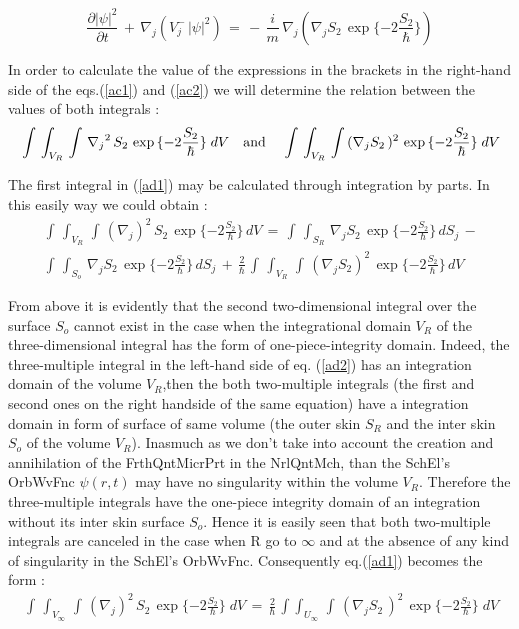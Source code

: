 \documentclass[12pt]{article}
\begin{document}
\begin{equation}\label{ac2}
\frac{\partial {\left|\psi\right|^2}}{\partial t}\,+
\,\nabla _j \left(V_j^{-}\,{\left|\psi\right|^2}\right)\,=
\,-\,\frac{i}{m}\,\nabla _j \left(\nabla _j {S_2}
\,\exp{\{-2\frac{S_2}{\hbar}\}}\right)
\end{equation}

 In order to calculate the value of the expressions in the brackets in the
right-hand side of the eqs.(\ref{ac1}) and (\ref{ac2}) we will determine
the relation between the values of both integrals :
\begin{equation}\label{ad1}
\,\int\,\int_{V_R}\,\int\,{\nabla_j}^2\,{S_2}\,
\exp{\{-2\frac{S_2}{\hbar}\}}\;dV
\quad {\rm and} \quad
\,\int\,\int_{V_R}\,\int\,(\nabla _j {S_2}\,)^2\,
\exp{\{-2\frac{S_2}{\hbar}\}}\;dV
\end{equation}

 The first integral in (\ref{ad1}) may be calculated through integration by
parts.  In this easily way we could obtain :
\begin{eqnarray}\label{ad2}
\,\int\,\int_{V_R}\,\int\,(\nabla _j)^2\,{S_2}
\,\exp{\{-2\frac{S_2}{\hbar}\}}\,dV\,=
\,\int\,\int_{S_R}\,\nabla _j {S_2}
\,\exp{\{-2\frac{S_2}{\hbar}\}}\,dS_j\,-  \nonumber  \\
\,\int\,\int_{S_o}\,\nabla_j {S_2}
\,\exp{\{-2\frac{S_2}{\hbar}\}}\,dS_j\,+
\,\frac{2}{\hbar}\,\int\,\int_{V_R}\,\int\,(\nabla _j {S_2})^2\,
\exp{\{-2\frac{S_2}{\hbar}\}}\,dV
\end{eqnarray}

 From above it is evidently that the second two-dimensional integral over
the surface $S_o$ cannot exist in the case when the integrational domain
$V_R$ of the three-dimensional integral has the form of one-piece-integrity
domain. Indeed, the three-multiple integral in the left-hand side of eq.
(\ref{ad2}) has an integration domain of the volume $V_R$,then the both
two-multiple integrals (the first and second ones on the right handside
of the same equation) have a integration domain in form of surface of same
volume (the outer skin $S_R$ and the inter skin $S_o$ of the volume $V_R$).
Inasmuch as we don't take into account the creation and annihilation of the
FrthQntMicrPrt in the NrlQntMch, than the SchEl's OrbWvFnc $\psi(r,t)$ may
have no singularity within the volume $V_R$. Therefore the three-multiple
integrals have the one-piece integrity domain of an integration without
its inter skin surface $S_o$. Hence it is easily seen that both two-multiple
integrals are canceled in the case when R go to $\infty$ and at the absence
of any kind of singularity in the SchEl's OrbWvFnc. Consequently eq.(\ref{ad1})
becomes the form :
\begin{eqnarray}\label{ae}
\,\int\,\int_{V_\infty}\,\int\,(\nabla _j)^2\,{S_2}
\,\exp{\{-2\frac{S_2}{\hbar}\}}\;dV\,
=\,\frac{2}{\hbar}\,\int\int_{U_\infty}\,\int\,(\nabla _j {S_2}\,)^2
\,\exp{\{-2\frac{S_2}{\hbar}\}}\;dV
\end{eqnarray}
\end{document}
